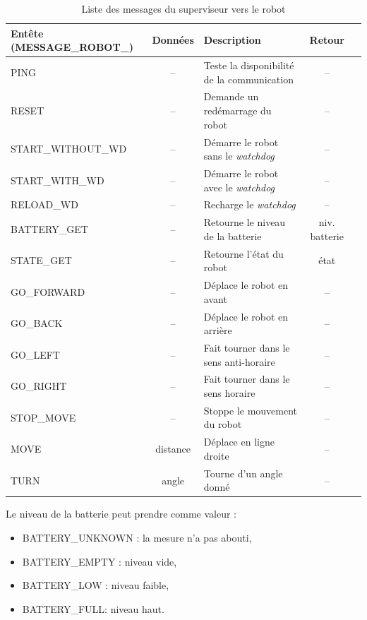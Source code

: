 \begin{appendices}
\begin{table}[htp]
\begin{center}
\begin{tabular}{|l|c|l|c|c|}
\hline
Entête (\scriptsize{MESSAGE\_ROBOT\_}) & Données & Description & Retour\\
\hline\hline
{\scriptsize PING} & -- & Teste la disponibilité de la communication &  --\\
{\scriptsize RESET} & -- & Demande un redémarrage du robot &  --\\
\hline
{\scriptsize START\_WITHOUT\_WD} & -- & Démarre le robot sans le {\it watchdog} & -- \\
{\scriptsize START\_WITH\_WD} &  -- & Démarre le robot avec le {\it watchdog} & -- \\
{\scriptsize RELOAD\_WD} & -- & Recharge le {\it watchdog} & --\\
\hline
{\scriptsize BATTERY\_GET} & -- & Retourne le niveau de la batterie & niv. batterie\\
{\scriptsize STATE\_GET} & -- & Retourne l'état du robot & état\\
\hline
{\scriptsize GO\_FORWARD} & -- & Déplace le robot en avant & -- \\
{\scriptsize GO\_BACK}  & -- & Déplace le robot en arrière & -- \\
{\scriptsize GO\_LEFT} & -- & Fait tourner dans le sens anti-horaire & -- \\
{\scriptsize GO\_RIGHT} & -- & Fait tourner dans le sens horaire & -- \\
{\scriptsize STOP\_MOVE} & -- & Stoppe le mouvement du robot & -- \\
\hline
{\scriptsize MOVE} & distance & Déplace en ligne droite & --\\
{\scriptsize TURN} & angle & Tourne d'un angle donné & -- \\
\hline
\end{tabular}
\end{center}
\caption{Liste des messages du superviseur vers le robot}
\label{tab:ordre_robot}
\end{table}%
\FloatBarrier

Le niveau de la batterie peut prendre comme valeur :
\begin{itemize}
	\item BATTERY\_UNKNOWN : la mesure n'a pas abouti,
	\item BATTERY\_EMPTY : niveau vide,
	\item BATTERY\_LOW : niveau faible,
	\item BATTERY\_FULL: niveau haut.
\end{itemize}


\end{appendices}
